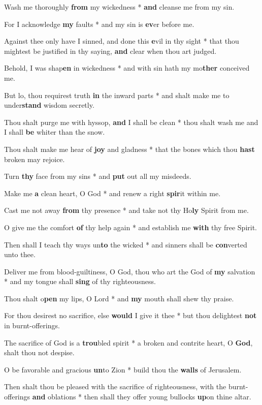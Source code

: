 \begin{multicols}{2}
	Wash me thoroughly \textbf{from} my wickedness * \textbf{and} cleanse me from my sin.
	
	For I acknowledge \textbf{my} faults * and my sin is \textbf{ev}er before me.
	
	Against thee only have I sinned, and done this \textbf{e}vil in thy sight * that thou mightest be justified in thy saying, \textbf{and} clear when thou art judged.
	
	Behold, I was shap\textbf{en} in wickedness * and with sin hath my mo\textbf{ther} conceived me.
	
	But lo, thou requirest truth \textbf{in} the inward parts * and shalt make me to under\textbf{stand} wisdom secretly.
	
	Thou shalt purge me with hyssop, \textbf{and} I shall be clean * thou shalt wash me and I shall \textbf{be} whiter than the snow.
	
	Thou shalt make me hear of \textbf{joy} and gladness * that the bones which thou \textbf{hast} broken may rejoice.
	
	Turn \textbf{thy} face from my sins * and \textbf{put} out all my misdeeds.
	
	Make me \textbf{a} clean heart, O God * and renew a right \textbf{spir}it within me.
	
	Cast me not away \textbf{from} thy presence * and take not thy Ho\textbf{ly} Spirit from me.
	
	O give me the comfort \textbf{of} thy help again * and establish me \textbf{with} thy free Spirit.
	
	Then shall I teach thy ways un\textbf{to} the wicked * and sinners shall be \textbf{con}verted unto thee.
	
	Deliver me from blood-guiltiness, O God, thou who art the God of \textbf{my} salvation * and my tongue shall \textbf{sing} of thy righteousness.
	
	Thou shalt o\textbf{pen} my lips, O Lord * and \textbf{my} mouth shall shew thy praise.
	
	For thou desirest no sacrifice, else \textbf{would} I give it thee * but thou delightest \textbf{not} in burnt-offerings.
	
	The sacrifice of God is a \textbf{trou}bled spirit * a broken and contrite heart, O \textbf{God}, shalt thou not despise.
	
	O be favorable and gracious \textbf{un}to Zion * build thou the \textbf{walls} of Jerusalem.
	
	Then shalt thou be pleased with the sacrifice of righteousness, with the burnt-offerings \textbf{and} oblations * then shall they offer young bullocks \textbf{up}on thine altar.
\end{multicols}